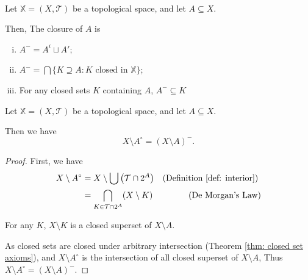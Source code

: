 \begin{theorem}
	\label{thm: some alternative definitions of closures}
	\
	
	Let $\mathbb X = (X, \mathcal T)$ be a topological space, and let $A \subseteq X$.
	
	Then, The closure of $A$ is
	\begin{enumerate}[(i)]
		\item $A^- =  A^i \sqcup A'$;
		\item $A^- = \bigcap \{K \supseteq A : K \text{ closed in $\mathbb X$}\}$;
		\item For any closed sets $K$ containing $A$, $A^- \subseteq K$
	\end{enumerate}
\end{theorem}


\begin{lemma}
	Let $\mathbb X = (X, \mathcal T)$ be a topological space, and let $A \subseteq X$.
	
	Then we have
	$$
	X \setminus A^\circ = (X \setminus A)^-.
	$$
	
	\begin{proof}
		First, we have
		$$
		\begin{aligned}
			X \setminus A^\circ &= X \setminus \bigcup \left(\mathcal T \cap 2^A \right) 
				& \text{(Definition \ref{def: interior}) }\\
			&= \bigcap_{K \in \mathcal T \cap 2^A} (X \setminus K)
				& \text{(De Morgan's Law)}\\
		\end{aligned}
		$$
		
		For any $K$, $X \setminus K$ is a closed superset of $X \setminus A$.
		
		As closed sets are closed under arbitrary intersection (Theorem \ref{thm: closed set axioms}), and $X \setminus A^\circ$ is the intersection of all closed superset of $X \setminus A$, Thus $X \setminus A^\circ = (X \setminus A)^-$.
	\end{proof}
\end{lemma}


